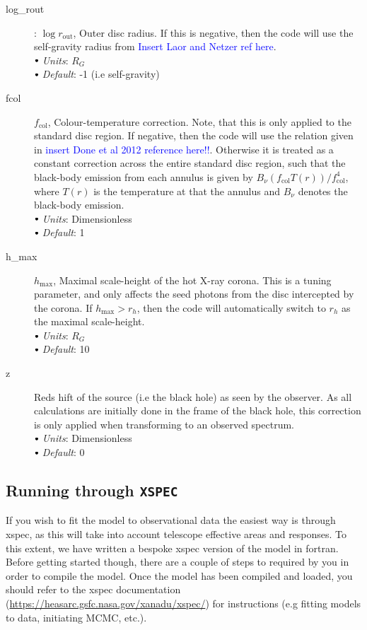\documentclass[a4paper, 11pt, times, onecolumn]{article}
\newcommand{\rout}{r_{\mathrm{out}}}
\newcommand{\fcol}{f_{\mathrm{col}}}
\newcommand{\hmax}{h_{\mathrm{max}}}
\newcommand{\sbt}{\,\begin{picture}(-1,1)(-1,-3)\circle*{3}\end{picture}\ }
\begin{document}
\begin{description}
	\item[log\_rout]: $\log \rout$, Outer disc radius. If this is negative, then the code will use the self-gravity radius from \textcolor{blue}{Insert Laor and Netzer ref here}. \\
		$\sbt$ {\it Units}: $R_{G}$ \\
		$\sbt$ {\it Default}: -1 (i.e self-gravity)
	
	\item[fcol] $\fcol$, Colour-temperature correction. Note, that this is only applied to the standard disc region. If negative, then the code will use the relation given in \textcolor{blue}{insert Done et al 2012 reference here!!}. Otherwise it is treated as a constant correction across the entire standard disc region, such that the black-body emission from each annulus is given by $B_{\nu}(\fcol T(r))/\fcol^{4}$, where $T(r)$ is the temperature at that the annulus and $B_{\nu}$ denotes the black-body emission.\\
		$\sbt$ {\it Units}: Dimensionless \\
		$\sbt$ {\it Default}: 1 
	
	\item[h\_max] $\hmax$, Maximal scale-height of the hot X-ray corona. This is a tuning parameter, and only affects the seed photons from the disc intercepted by the corona. If $\hmax > r_{h}$, then the code will automatically switch to $r_{h}$ as the maximal scale-height. \\
		$\sbt$ {\it Units}: $R_{G}$ \\
		$\sbt$ {\it Default}: 10
	
	\item[z] Reds
hift of the source (i.e the black hole) as seen by the observer. As all calculations are initially done in the frame of the black hole, this correction is only applied when transforming to an observed spectrum. \\
		$\sbt$ {\it Units}: Dimensionless \\
		$\sbt$ {\it Default}: 0
		
\end{description}



\subsection{Running through {\tt XSPEC}}

If you wish to fit the model to observational data the easiest way is through {\sc xspec}, as this will take into account telescope effective areas and responses. To this extent, we have written a bespoke {\sc xspec} version of the model in {\sc fortran}. Before getting started though, there are a couple of steps to required by you in order to compile the model. Once the model has been compiled and loaded, you should refer to the {\sc xspec} documentation (\url{https://heasarc.gsfc.nasa.gov/xanadu/xspec/}) for instructions (e.g fitting models to data, initiating MCMC, etc.).
\end{document}
